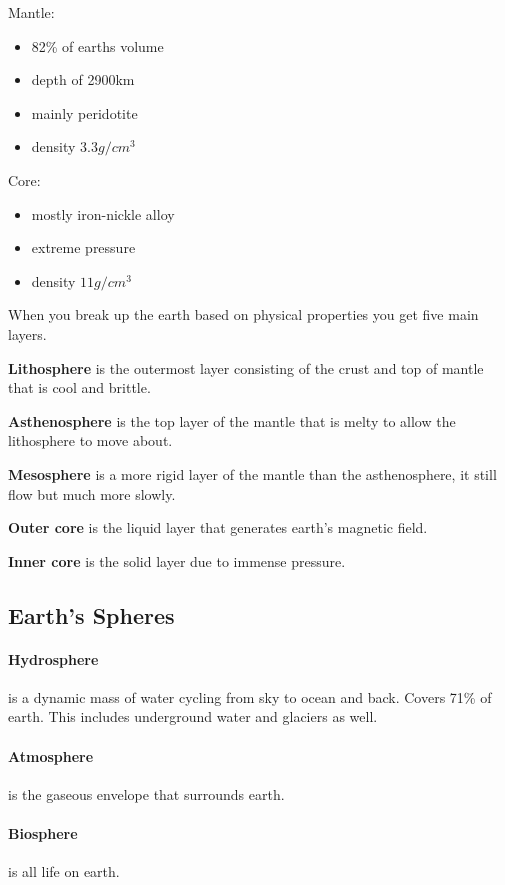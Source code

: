 \documentclass{article}
\begin{document}
Mantle:
\begin{itemize}
    \item 82\% of earths volume
    \item depth of 2900km
    \item mainly peridotite
    \item density $3.3g/cm^3$
\end{itemize}

Core:
\begin{itemize}
    \item mostly iron-nickle alloy
    \item extreme pressure
    \item density $11g/cm^3$
\end{itemize}

When you break up the earth based on physical properties you get five main layers.

\textbf{Lithosphere} is the outermost layer consisting of the crust and top of mantle that is cool and brittle.

\textbf{Asthenosphere} is the top layer of the mantle that is melty to allow the lithosphere to move about.

\textbf{Mesosphere} is a more rigid layer of the mantle than the asthenosphere, it still flow but much more slowly.

\textbf{Outer core} is the liquid layer that generates earth's magnetic field.

\textbf{Inner core} is the solid layer due to immense pressure.

\subsection{Earth's Spheres} %
\label{sub:earth_s_spheres}

\paragraph{Hydrosphere} is a dynamic mass of water cycling from sky to ocean and back. Covers 71\% of earth. This includes underground water and glaciers as well.

\paragraph{Atmosphere} is the gaseous envelope that surrounds earth.

\paragraph{Biosphere} is all life on earth.
\end{document}

